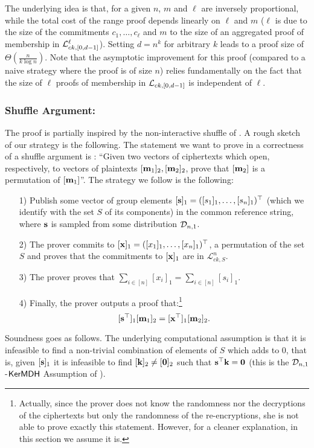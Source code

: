 The underlying idea is that, for a given $n$, $m$ and $\ell$ are inversely proportional, while the total cost of the range proof depends linearly on $\ell$ and $m$ ($\ell$ is due to the size of the commitments $c_1,\ldots,c_\ell$ and $m$ to the size of an aggregated proof of membership in $\mathcal{L}_{ck,[0,d-1]}^\ell$).  Setting $d=n^{k}$ for arbitrary $k$ leads to a proof size of $\Theta(\frac{n}{k \log n})$. 
Note that the asymptotic improvement for this proof (compared to a naive strategy where the proof is of size $n$) relies fundamentally on the fact that the size of $\ell$ proofs of membership in $\mathcal{L}_{ck,[0,d-1]}$ is independent of $\ell$. 
  \subsubsection{Shuffle Argument:} The proof is partially inspired by the non-interactive shuffle of \cite{AC:GroLu07}. A rough sketch of our strategy is the following. The statement we want to prove in a correctness of a shuffle argument is : ``Given two vectors of ciphertexts which open, respectively, to vectors of plaintexts $[\mathbf{m}_1]_2, [\mathbf{m}_2]_2$, prove that 
 $[\mathbf{m}_2]$ is a permutation of $[\mathbf{m}_1]$''. 
The strategy we follow is the following:  
\begin{itemize}
\item[1)] Publish some vector of group elements $[\mathbf{s}]_1 =([s_1]_1,\ldots,[s_n]_1)^\top$ (which we identify with the set $S$ of its components) in the common reference string, where $\mathbf{s}$ is sampled from some distribution $\mathcal{D}_{n,1}$.
\item[2)] The prover commits to $[\mathbf{x}]_1=([x_1]_1,\ldots,[x_n]_1)^\top$, a permutation of the set $S$ and proves that the commitments to $[\mathbf{x}]_1$ are in $\mathcal{L}^{n}_{ck,S}$.
\item[3)] The prover proves that $\sum_{i \in [n]} [x_i]_1 =\sum_{i \in [n]} [s_i]_1$.
\item[4)] Finally, the prover outputs a proof that:\footnote{Actually, since the prover does not know the randomness nor the decryptions of the ciphertexts but only the randomness of the re-encryptions, she is not able to prove exactly this statement. However, for a cleaner explanation, in this section we assume it is.} 
\begin{equation}\label{shuffle:ker}[\mathbf{s}^{\top}]_1 [\mathbf{m}_1]_2 =[\mathbf{x}^{\top}]_1 [\mathbf{m}_2]_2.
\end{equation}
\end{itemize}
Soundness goes as follows. The underlying computational assumption is that it is infeasible to find a non-trivial combination of elements of $S$ which adds to $0$, that is, given $[\mathbf{s}]_1$ it is infeasible to find $[\mathbf{k}]_2 \neq [\mathbf{0}]_2$ such that
$\mathbf{s}^{\top} \mathbf{k}=\mathbf{0}$ (this is the $\mathcal{D}_{n,1}$-$\mathsf{KerMDH}$ Assumption of \cite{EPRINT:MorRafVil15}). 
 
